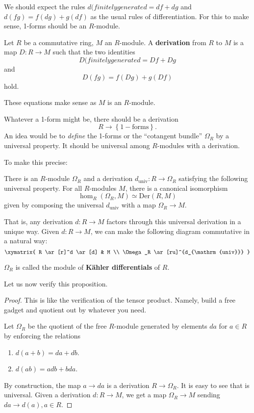 We should expect the rules $d(finitely generated  = df+dg$ and $d(fg) = f(dg) + g(df)$ as the
usual rules of differentiation. For this to make sense, 1-forms should be an
$R$-module. 

\begin{definition} 
Let $R$ be a commutative ring, $M$ an $R$-module. A \textbf{derivation} from
$R$ to $M$ is a map $D: R \to M$ such that the two identities
\[ D(finitely generated = Df + Dg  \]
and
\[ D(fg) = f(Dg) + g(Df)  \]
hold.
\end{definition} 
These equations make sense as $M$ is an $R$-module.

Whatever a 1-form might be, there should be a derivation
\[ R \to \left\{\mathrm{1-forms}\right\}.  \]
An idea would be to \emph{define} the 1-forms or the ``cotangent bundle''
$\Omega_R$ by a
universal property. It should be universal among $R$-modules with a derivation.

To make this precise:
\begin{proposition} 
There is an $R$-module $\Omega_R$ and a derivation $d_{\mathrm{univ}} : R \to
\Omega_R$ satisfying the following universal property. For all $R$-modules
$M$, there is a canonical isomorphism 
\[ \hom_{R}(\Omega_R, M) \simeq \mathrm{Der}(R, M)  \]
given by composing the universal $d_{\mathrm{univ}}$ with a map $\Omega_R \to M$.
\end{proposition} 

That is, any derivation $d: R \to M$ factors through this universal derivation
in a unique way. Given $d: R \to M$, we can make the following diagram
commutative in a natural way:
\[ 
\xymatrix{
R \ar[r]^d \ar[d]  &  M \\
\Omega_R \ar[ru]^{d_{\mathrm{univ}}}
}
\]

\begin{definition} 
$\Omega_R$ is called the module of \textbf{K\"ahler differentials} of $R$.
\end{definition} 

Let us now verify this proposition.
\begin{proof} 
This is like the verification of the tensor product. Namely, build a free
gadget and quotient out by whatever you need.

Let $\Omega_R$ be the quotient of the free $R$-module generated by elements
$da$ for $a \in R$ by enforcing the relations
\begin{enumerate}
\item $d(a+b) =da + db$. 
\item $d(ab) = adb + bda$.
\end{enumerate}
By construction, the map $a \to da$ is a derivation $R \to \Omega_R$. 
It is easy to see that is universal. Given a derivation $d: R \to M$, we get a
map $\Omega_R \to M$ sending $da \to d(a), a \in R$.
\end{proof} 

